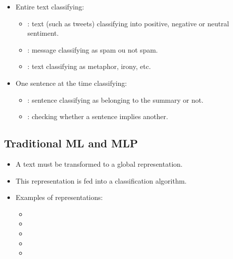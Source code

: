 \documentclass{KBook}
\begin{document}
	
	\begin{itemize}
		\item Entire text classifying:
		\begin{itemize}
			\item {}: text (such as tweets) classifying into positive, negative or neutral sentiment.
			\item {}: message classifying as spam ou not spam.
			\item {}: text classifying as metaphor, irony, etc.
		\end{itemize}
		\item One sentence at the time classifying:
		\begin{itemize}
			\item {}: sentence classifying as belonging to the summary or not.
			\item {}: checking whether a sentence implies another.
		\end{itemize}
	\end{itemize}
	

\subsection{Traditional ML and MLP}

	
	\begin{itemize}
		\item A text must be transformed to a global representation.
		\item This representation is fed into a classification algorithm.
		\item Examples of representations:
		\begin{itemize}
			\item {}
			\item {}
			\item {}
			\item {}
			\item {}
		\end{itemize}
	\end{itemize}
	
\end{document}
